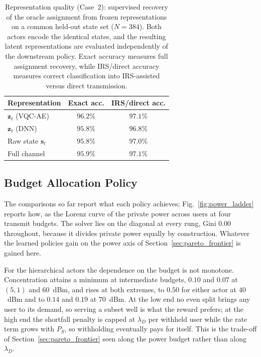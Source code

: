 \documentclass[12pt,onecolumn]{IEEEtran}
\begin{document}
\begin{table}[t]
\centering
\caption{Representation quality (Case~2): supervised recovery of the oracle assignment from frozen
representations on a common held-out state set ($N=384$). Both actors encode the identical
states, and the resulting latent representations are evaluated independently of the downstream
policy. Exact accuracy measures full assignment recovery, while IRS/direct accuracy measures
correct classification into IRS-assisted versus direct transmission.
}
\label{tab:abl_repr}
\begin{tabular}{lcc}
\toprule
Representation & Exact acc. & IRS/direct acc. \\
\midrule
$\mathbf{z}_t$ (VQC-AE)             & $96.2\%$ & $97.1\%$ \\
$\mathbf{z}_t$ (DNN)                & $95.8\%$ & $96.8\%$ \\
Raw state $\mathbf{s}_t$            & $95.8\%$ & $97.0\%$ \\
Full channel                        & $95.9\%$ & $97.1\%$ \\
\bottomrule
\end{tabular}
\end{table}
\fi

\subsection{Budget Allocation Policy}
\label{sec:results_alloc}

The comparisons so far report what each policy achieves; Fig.~\ref{fig:power_ladder}
reports how, as the Lorenz curve of the private power across users at four transmit
budgets. The solver lies on the diagonal at every rung, Gini $0.00$ throughout, because it
divides private power equally by construction. Whatever the learned policies gain on the
power axis of Section~\ref{sec:pareto_frontier} is gained here.

For the hierarchical actors the dependence on the budget is not monotone. Concentration
attains a minimum at intermediate budgets, $0.10$ and $0.07$ at $(5,1)$ and $60$~dBm, and
rises at both extremes, to $0.50$ for either actor at $40$~dBm and to $0.14$ and $0.19$ at
$70$~dBm. At the low end no even split brings any user
to its demand, so serving a subset well is what the reward prefers; at the high end the
shortfall penalty is capped at $\lambda_D$ per withheld user while the rate term grows with
$P_S$, so withholding eventually pays for itself. This is the trade-off of
Section~\ref{sec:pareto_frontier} seen along the power budget rather than along $\lambda_D$.
\end{document}
